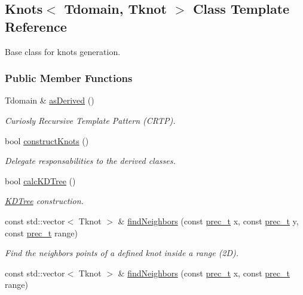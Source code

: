 \hypertarget{classKnots}{
\subsection{Knots$<$ Tdomain, Tknot $>$ Class Template Reference}
\label{classKnots}
}
Base class for knots generation.  


\subsubsection*{Public Member Functions}
\begin{CompactItemize}
\item 
Tdomain \& \hyperlink{classKnots_e3b3eef036a98b0269f4e6f6c488201b}{asDerived} ()
\begin{CompactList}\small\item\em Curiosly Recursive Template Pattern (CRTP). \item\end{CompactList}\item 
bool \hyperlink{classKnots_8e622932aee837d4c3465093f3158ebb}{constructKnots} ()
\begin{CompactList}\small\item\em Delegate responsabilities to the derived classes. \item\end{CompactList}\item 
bool \hyperlink{classKnots_bfdff0840a5878ae0dd0f317c81a4630}{calcKDTree} ()
\begin{CompactList}\small\item\em \hyperlink{namespaceKDTree}{KDTree} construction. \item\end{CompactList}\item 
const std::vector$<$ Tknot $>$ \& \hyperlink{classKnots_dd136cbe2ce6474885aab4829576472b}{findNeighbors} (const \hyperlink{Traits_8hpp_81f62fadeebafe942380746e380c72a5}{prec\_\-t} x, const \hyperlink{Traits_8hpp_81f62fadeebafe942380746e380c72a5}{prec\_\-t} y, const \hyperlink{Traits_8hpp_81f62fadeebafe942380746e380c72a5}{prec\_\-t} range)
\begin{CompactList}\small\item\em Find the neighbors points of a defined knot inside a range (2D). \item\end{CompactList}\item 
const std::vector$<$ Tknot $>$ \& \hyperlink{classKnots_87739b3b70c0d10ae548ae1d1d0bdbe6}{findNeighbors} (const \hyperlink{Traits_8hpp_81f62fadeebafe942380746e380c72a5}{prec\_\-t} x, const \hyperlink{Traits_8hpp_81f62fadeebafe942380746e380c72a5}{prec\_\-t} range)

\end{CompactItemize}
